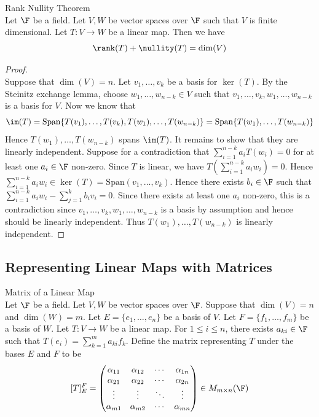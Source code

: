 \documentclass[a4paper]{article}
\begin{document}
\begin{thm}{Rank Nullity Theorem}{}\\
Let $\F$ be a field. Let $V,W$ be vector spaces over $\F$ such that $V$ is finite dimensional. Let $T:V\to W$ be a linear map. Then we have $$\rank(T)+\nullity(T)=\dim(V)$$
\begin{proof}\\
Suppose that $\dim(V)=n$. Let $v_1,\dots,v_k$ be a basis for $\ker(T)$. By the Steinitz exchange lemma, choose $w_1,\dots,w_{n-k}\in V$ such that $v_1,\dots,v_k,w_1,\dots,w_{n-k}$ is a basis for $V$. Now we know that $$\im(T)=\text{Span}\{T(v_1),\dots,T(v_k),T(w_1),\dots,T(w_{n-k})\}=\text{Span}\{T(w_1),\dots,T(w_{n-k})\}$$ Hence $T(w_1),\dots,T(w_{n-k})$ spans $\im(T)$. It remains to show that they are linearly independent. Suppose for a contradiction that $\sum_{i=1}^{n-k}a_iT(w_i)=0$ for at least one $a_i\in\F$ non-zero. Since $T$ is linear, we have $T\left(\sum_{i=1}^{n-k}a_iw_i\right)=0$. Hence $\sum_{i=1}^{n-k}a_iw_i\in\ker(T)=\text{Span}(v_1,\dots,v_k)$. Hence there exists $b_i\in\F$ such that $\sum_{i=1}^{n-k}a_iw_i-\sum_{j=1}^kb_iv_i=0$. Since there exists at least one $a_i$ non-zero, this is a contradiction since $v_1,\dots,v_k,w_1,\dots,w_{n-k}$ is a basis by assumption and hence should be linearly independent. Thus $T(w_1),\dots,T(w_{n-k})$ is linearly independent. 
\end{proof}
\end{thm}

\subsection{Representing Linear Maps with Matrices}
\begin{defn}{Matrix of a Linear Map}{}\\
Let $\F$ be a field. Let $V,W$ be vector spaces over $\F$. Suppose that $\dim(V)=n$ and $\dim(W)=m$. Let $E=\{e_1,\dots,e_n\}$ be a basis of $V$. Let $F=\{f_1,\dots,f_m\}$ be a basis of $W$. Let $T:V\to W$ be a linear map. For $1\leq i\leq n$, there exists $a_{ki}\in\F$ such that $T(e_i)=\sum_{k=1}^ma_{ki}f_k$. Define the matrix representing $T$ under the bases $E$ and $F$ to be $$[T]_E^F=\begin{pmatrix}
\alpha_{11} & \alpha_{12} & \cdots & \alpha_{1n}\\
\alpha_{21} & \alpha_{22} & \cdots & \alpha_{2n}\\
\vdots & \vdots & \ddots & \vdots\\
\alpha_{m1} & \alpha_{m2} & \cdots & \alpha_{mn}\\
\end{pmatrix}\in M_{m\times n}(\F)$$
\end{defn}
\end{document}
